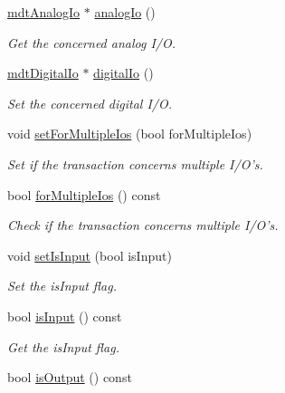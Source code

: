 \begin{DoxyCompactItemize}
\hyperlink{classmdt_analog_io}{mdtAnalogIo} $\ast$ \hyperlink{classmdt_port_transaction_a59409e826441bcff560ea3e44b885d64}{analogIo} ()
\begin{DoxyCompactList}\small\item\em Get the concerned analog I/O. \end{DoxyCompactList}\item 
\hyperlink{classmdt_digital_io}{mdtDigitalIo} $\ast$ \hyperlink{classmdt_port_transaction_a0515e5ded32eb76047586fdb6274d3eb}{digitalIo} ()
\begin{DoxyCompactList}\small\item\em Set the concerned digital I/O. \end{DoxyCompactList}\item 
void \hyperlink{classmdt_port_transaction_ad375898319b7118ab485070314da238d}{setForMultipleIos} (bool forMultipleIos)
\begin{DoxyCompactList}\small\item\em Set if the transaction concerns multiple I/O's. \end{DoxyCompactList}\item 
bool \hyperlink{classmdt_port_transaction_a89245c851c75c612dba96548b15da51e}{forMultipleIos} () const 
\begin{DoxyCompactList}\small\item\em Check if the transaction concerns multiple I/O's. \end{DoxyCompactList}\item 
\hypertarget{classmdt_port_transaction_ad49afb93f44aca47ded0e03018f8266f}{
void \hyperlink{classmdt_port_transaction_ad49afb93f44aca47ded0e03018f8266f}{setIsInput} (bool isInput)}
\label{classmdt_port_transaction_ad49afb93f44aca47ded0e03018f8266f}

\begin{DoxyCompactList}\small\item\em Set the isInput flag. \end{DoxyCompactList}\item 
\hypertarget{classmdt_port_transaction_a2aaf0f003556d7f93ec2d3846589673d}{
bool \hyperlink{classmdt_port_transaction_a2aaf0f003556d7f93ec2d3846589673d}{isInput} () const }
\label{classmdt_port_transaction_a2aaf0f003556d7f93ec2d3846589673d}

\begin{DoxyCompactList}\small\item\em Get the isInput flag. \end{DoxyCompactList}\item 
\hypertarget{classmdt_port_transaction_af628e8888c15525777504111a687b6a0}{
bool \hyperlink{classmdt_port_transaction_af628e8888c15525777504111a687b6a0}{isOutput} () const }
\label{classmdt_port_transaction_af628e8888c15525777504111a687b6a0}


\end{DoxyCompactItemize}
